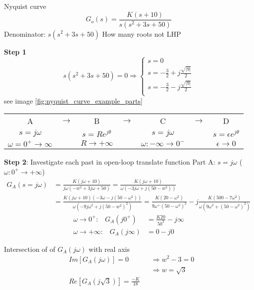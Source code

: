 \documentclass{article}
\begin{document}
\begin{exampleblock}{Nyquist curve}
    \begin{equation*}
        G_o(s) = \frac{K(s+10)}{s(s^2+3s+50)}
    \end{equation*}
    Denominator: $s(s^2 + 3s + 50)$
    How many roots not LHP

    \textbf{Step 1}
    \begin{equation*}
        s(s^2+3s+50) = 0 \Rightarrow 
        \begin{cases}
            s = 0 \\
            s = -\frac{3}{2} + j\frac{\sqrt{|9|}}{2} \\
            s = -\frac{3}{2} - j\frac{\sqrt{|9|}}{2} \\
        \end{cases}
    \end{equation*}
    see image \ref{fig:nyquist_curve_example_parts}

    \begin{tabular}{ c c c c c c c }
        A  &  $\rightarrow$  &  B  &  $\rightarrow$  &  C  &  $\rightarrow$ & D \\
        $s=j\omega$  &  &  $s=Re^{j\theta}$  &  &  $s=j\omega$  &  &  $s=\epsilon e^{j\theta}$ \\
        $\omega=0^{+}\to\infty$  &  &  $R\to+\infty$  &  &  $\omega:-\infty\to0^{-}$  &  &  $\epsilon\to0$ \\
    \end{tabular}

    \textbf{Step 2}: Investigate each past in open-loop translate function \newline
    Part A: $s=j\omega$ ($\omega:0^{+}\to+\infty$)
    \begin{align*}
        G_A(s=j\omega) &= \frac{K(j\omega + 10)}{j\omega(-w^2+3j\omega+50)}
        = \frac{K(j\omega + 10)}{\omega(-3j\omega+j(50-w^2))} \\
        &= \frac{K(j\omega + 10)(-3\omega - j(50-\omega^2))}{\omega(-9j\omega^2+j(50-w^2)^2)} 
        = \frac{K(20-\omega^2)}{9\omega^ + (50-\omega^2)^2} - j\frac{K(500-7\omega^2)}{\omega(9\omega^2+(50-\omega^2)^2)}
    \end{align*}
    \begin{align*}
        \omega\to0^+: \;\;\; G_A(j0^+) &= \frac{K20}{50^2} - j\infty  \\
        \omega\to+\infty: \;\;\; G_A(j\infty) &= 0 - j0
    \end{align*}

    Intersection of of $G_A(j\omega)$ with real axis 
    \begin{align*}
        &Im[G_A(j\omega)] = 0 & &\Rightarrow w^2 -3 = 0 \\
        & & &\Rightarrow w = \sqrt{3} \\
        &Re[G_A(j\sqrt{3})] = \frac{-K}{18}
    \end{align*}


\end{exampleblock}
\end{document}
